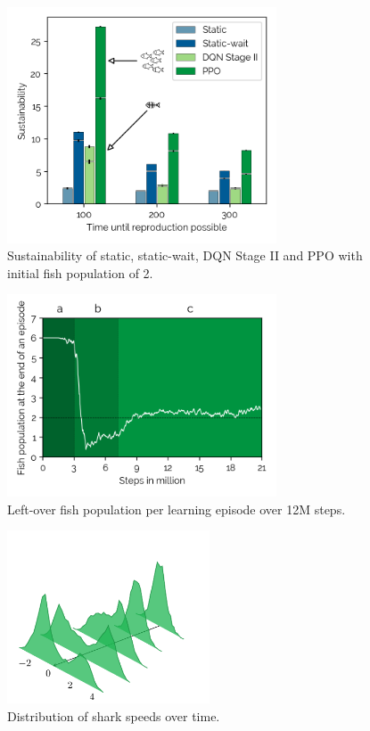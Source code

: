 \documentclass[letterpaper]{article}
\begin{document}
\begin{figure}[t]
\begin{center}
\includegraphics[width=8cm]{figures/dqncomp2fish_2.png}
\caption{Sustainability of static, static-wait, DQN Stage II and PPO with initial fish population of 2.}
\label{fig:dqncomp2}
\end{center}
\end{figure}

\begin{figure}[t]
\begin{center}
\includegraphics[width=8cm]{figures/fish_pop_chart3.png}
\caption{Left-over fish population per learning episode over 12M steps.}
\label{fig:fish_pop}
\end{center}
\end{figure}

\begin{figure}[t]
\begin{center}
\includegraphics[width=6cm]{figures/shark_speeds.png}
\caption{Distribution of shark speeds over time.}
\label{fig:shark_speeds}
\end{center}
\end{figure}
\end{document}
